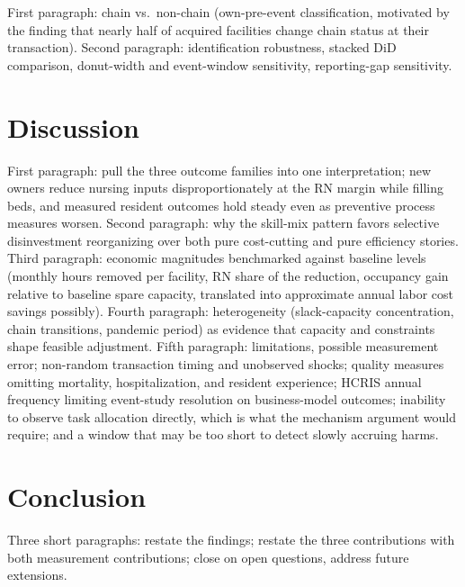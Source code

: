 \documentclass[12pt]{article}
\begin{document}
First paragraph: chain vs.\ non-chain (own-pre-event classification, motivated by the finding that nearly half of acquired facilities change chain status at their transaction). Second paragraph: identification robustness, stacked DiD comparison, donut-width and event-window sensitivity, reporting-gap sensitivity. 

\section{Discussion}\label{sec:discussion}

First paragraph: pull the three outcome families into one interpretation; new owners reduce nursing inputs disproportionately at the RN margin while filling beds, and measured resident outcomes hold steady even as preventive process measures worsen. Second paragraph: why the skill-mix pattern favors selective disinvestment reorganizing over both pure cost-cutting and pure efficiency stories. Third paragraph: economic magnitudes benchmarked against baseline levels (monthly hours removed per facility, RN share of the reduction, occupancy gain relative to baseline spare capacity, translated into approximate annual labor cost savings possibly). Fourth paragraph: heterogeneity (slack-capacity concentration, chain transitions, pandemic period) as evidence that capacity and constraints shape feasible adjustment. Fifth paragraph: limitations, possible measurement error; non-random transaction timing and unobserved shocks; quality measures omitting mortality, hospitalization, and resident experience; HCRIS annual frequency limiting event-study resolution on business-model outcomes; inability to observe task allocation directly, which is what the mechanism argument would require; and a window that may be too short to detect slowly accruing harms.

\section{Conclusion} \label{sec:conclusion}

Three short paragraphs: restate the findings; restate the three contributions with both measurement contributions; close on open questions, address future extensions.
\end{document}
